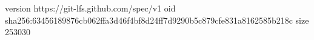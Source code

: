 version https://git-lfs.github.com/spec/v1
oid sha256:63456189876cb062ffa3d46f4bf8d24ff7d9290b5c879cfe831a8162585b218c
size 253030
